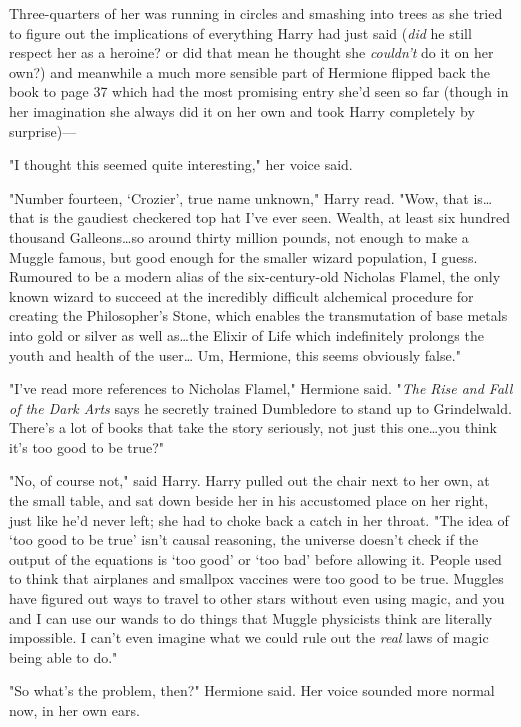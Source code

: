 Three-quarters of her was running in circles and smashing into trees as she
tried to figure out the implications of everything Harry had just said
(\emph{did} he still respect her as a heroine? or did that mean he thought she
\emph{couldn’t} do it on her own?) and meanwhile a much more sensible part of
Hermione flipped back the book to page 37 which had the most promising entry
she’d seen so far (though in her imagination she always did it on her own and
took Harry completely by surprise)—

"I thought this seemed quite interesting," her voice said.

"Number fourteen, ‘Crozier’, true name unknown," Harry read. "Wow, that
is…that is the gaudiest checkered top hat I’ve ever seen. Wealth, at
least six hundred thousand Galleons…so around thirty million pounds,
not enough to make a Muggle famous, but good enough for the smaller wizard
population, I guess. Rumoured to be a modern alias of the six-century-old
Nicholas Flamel, the only known wizard to succeed at the incredibly difficult
alchemical procedure for creating the Philosopher’s Stone, which enables the
transmutation of base metals into gold or silver as well as…the Elixir
of Life which indefinitely prolongs the youth and health of the user…
Um, Hermione, this seems obviously false."

"I’ve read more references to Nicholas Flamel," Hermione said. "\emph{The Rise
and Fall of the Dark Arts} says he secretly trained Dumbledore to stand up to
Grindelwald. There’s a lot of books that take the story seriously, not just
this one…you think it’s too good to be true?"

"No, of course not," said Harry. Harry pulled out the chair next to her own, at
the small table, and sat down beside her in his accustomed place on her right,
just like he’d never left; she had to choke back a catch in her throat. "The
idea of ‘too good to be true’ isn’t causal reasoning, the universe doesn’t
check if the output of the equations is ‘too good’ or ‘too bad’ before allowing
it. People used to think that airplanes and smallpox vaccines were too good to
be true. Muggles have figured out ways to travel to other stars without even
using magic, and you and I can use our wands to do things that Muggle
physicists think are literally impossible. I can’t even imagine what we could
rule out the \emph{real} laws of magic being able to do."

"So what’s the problem, then?" Hermione said. Her voice sounded more normal
now, in her own ears.

